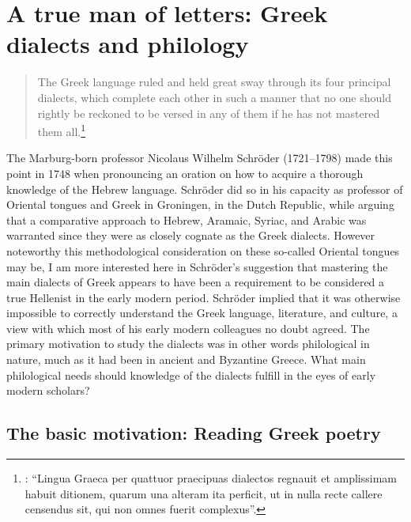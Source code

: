 \chapter{A true man of letters: Greek dialects and philology}

\label{chap:3}
\begin{quote}
The Greek language ruled and held great sway through its four principal dialects, which complete each other in such a manner that no one should rightly be reckoned to be versed in any of them if he has not mastered them all.\footnote{\citet[53--54]{Schroeder1748}: “Lingua Graeca per quattuor praecipuas dialectos regnauit et amplissimam habuit ditionem, quarum una alteram ita perficit, ut in nulla recte callere censendus sit, qui non omnes fuerit complexus”.}
\end{quote}

The Marburg-born professor Nicolaus Wilhelm Schröder (1721–1798) made this point in 1748 when pronouncing an oration on how to acquire a thorough knowledge of the Hebrew language. Schröder did so in his capacity as professor of Oriental tongues and Greek in Groningen, in the Dutch Republic, while arguing that a comparative approach to Hebrew, Aramaic, Syriac, and Arabic was warranted since they were as closely cognate as the Greek dialects. However noteworthy this methodological consideration on these so-called Oriental tongues may be, I am more interested here in Schröder’s suggestion that mastering the main dialects of Greek appears to have been a requirement to be considered a true Hellenist in the early modern period. Schröder implied that it was otherwise impossible to correctly understand the Greek language, literature, and culture, a view with which most of his early modern colleagues no doubt agreed. The primary motivation to study the dialects was in other words philological in nature, much as it had been in ancient and Byzantine Greece. What main philological needs should knowledge of the dialects fulfill in the eyes of early modern scholars?

\section{The basic motivation: Reading Greek poetry}\label{sec:3.1}

